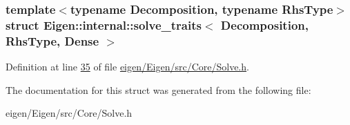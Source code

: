 \subsubsection*{template$<$typename Decomposition, typename Rhs\+Type$>$\newline
struct Eigen\+::internal\+::solve\+\_\+traits$<$ Decomposition, Rhs\+Type, Dense $>$}



Definition at line \hyperlink{eigen_2_eigen_2src_2_core_2_solve_8h_source_l00035}{35} of file \hyperlink{eigen_2_eigen_2src_2_core_2_solve_8h_source}{eigen/\+Eigen/src/\+Core/\+Solve.\+h}.



The documentation for this struct was generated from the following file\+:\begin{DoxyCompactItemize}
\item 
eigen/\+Eigen/src/\+Core/\+Solve.\+h\end{DoxyCompactItemize}
